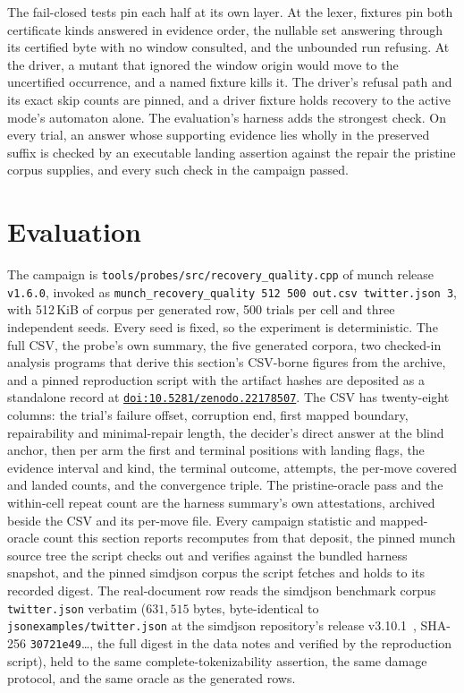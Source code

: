 \documentclass[11pt,a4paper]{article}
\newcommand{\doi}[1]{\href{https://doi.org/#1}{\nolinkurl{doi:#1}}}
\theoremstyle{definition}
\theoremstyle{plain}
\theoremstyle{remark}
\newcommand{\code}[1]{\texttt{#1}}
\begin{document}
The fail-closed tests pin each half at its own layer. At the lexer, fixtures pin both certificate kinds answered in
evidence order, the nullable set answering through its certified byte with no window consulted, and the unbounded run
refusing. At the driver, a mutant that ignored the window origin would move to the uncertified occurrence, and a named
fixture kills it. The driver's refusal path and its exact skip counts are pinned, and a driver fixture holds recovery to
the active mode's automaton alone. The evaluation's harness adds the strongest check. On every trial, an answer whose
supporting evidence lies wholly in the preserved suffix is checked by an executable landing assertion against the repair
the pristine corpus supplies, and every such check in the campaign passed.

\section{Evaluation}
\label{sec:eval}

The campaign is \code{tools/probes/src/recovery\_quality.cpp} of munch release \code{v1.6.0}, invoked as
\code{munch\_recovery\_quality 512 500 out.csv twitter.json 3}, with 512\,KiB of corpus per generated row, 500 trials
per cell and three independent seeds. Every seed is fixed, so the experiment is deterministic. The full CSV, the probe's
own summary, the five generated corpora, two checked-in analysis programs that derive this section's CSV-borne figures
from the archive, and a pinned reproduction script with the artifact hashes are deposited as a standalone record at
\doi{10.5281/zenodo.22178507}. The CSV has twenty-eight columns: the trial's failure offset, corruption end, first
mapped boundary, repairability and minimal-repair length, the decider's direct answer at the blind anchor, then per arm
the first and terminal positions with landing flags, the evidence interval and kind, the terminal outcome, attempts, the
per-move covered and landed counts, and the convergence triple. The pristine-oracle pass and the within-cell repeat
count are the harness summary's own attestations, archived beside the CSV and its per-move file. Every campaign
statistic and mapped-oracle count this section reports recomputes from that deposit, the pinned munch source tree the
script checks out and verifies against the bundled harness snapshot, and the pinned simdjson corpus the script fetches
and holds to its recorded digest. The real-document row reads the simdjson benchmark corpus \code{twitter.json} verbatim
($631{,}515$ bytes, byte-identical to \code{jsonexamples/twitter.json} at the simdjson repository's release
v3.10.1~\citep{simdjsondata}, SHA-256 \code{30721e49}\ldots, the full digest in the data notes and verified by the
reproduction script), held to the same complete-tokenizability assertion, the same damage protocol, and the same oracle
as the generated rows.
\end{document}
